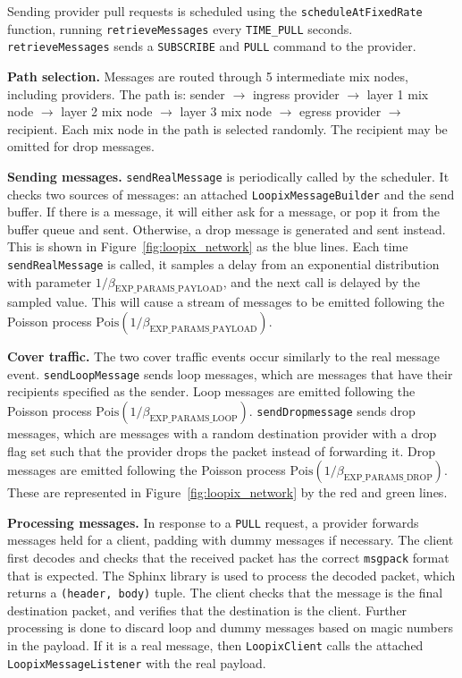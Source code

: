 \documentclass[final,dissertation.tex]{subfiles}
\begin{document}
Sending provider pull requests is scheduled using the \verb|scheduleAtFixedRate| function, running \verb|retrieveMessages| every \verb|TIME_PULL| seconds. \verb|retrieveMessages| sends a \verb|SUBSCRIBE| and \verb|PULL| command to the provider.

\textbf{Path selection.} Messages are routed through 5 intermediate mix nodes, including providers. The path is: sender $\rightarrow$ ingress provider $\rightarrow$ layer 1 mix node $\rightarrow$ layer 2 mix node $\rightarrow$ layer 3 mix node $\rightarrow$ egress provider $\rightarrow$ recipient. Each mix node in the path is selected randomly. The recipient may be omitted for drop messages.

\textbf{Sending messages.} \verb|sendRealMessage| is periodically called by the scheduler. It checks two sources of messages: an attached \verb|LoopixMessageBuilder| and the send buffer. If there is a message, it will either ask for a message, or pop it from the buffer queue and sent. Otherwise, a drop message is generated and sent instead. This is shown in Figure~\ref{fig:loopix_network} as the blue lines. Each time \verb|sendRealMessage| is called, it samples a delay from an exponential distribution with parameter $1/\beta_\text{EXP\_PARAMS\_PAYLOAD}$, and the next call is delayed by the sampled value. This will cause a stream of messages to be emitted following the Poisson process $\text{Pois}(1/\beta_\text{EXP\_PARAMS\_PAYLOAD})$.

\textbf{Cover traffic.} The two cover traffic events occur similarly to the real message event. \verb|sendLoopMessage| sends loop messages, which are messages that have their recipients specified as the sender. Loop messages are emitted following the Poisson process $\text{Pois}(1/\beta_\text{EXP\_PARAMS\_LOOP})$. \verb|sendDropmessage| sends drop messages, which are messages with a random destination provider with a drop flag set such that the provider drops the packet instead of forwarding it. Drop messages are emitted following the Poisson process $\text{Pois}(1/\beta_\text{EXP\_PARAMS\_DROP})$. These are represented in Figure~\ref{fig:loopix_network} by the red and green lines.

\textbf{Processing messages.} In response to a \verb|PULL| request, a provider forwards messages held for a client, padding with dummy messages if necessary. The client first decodes and checks that the received packet has the correct \verb|msgpack| format that is expected. The Sphinx library is used to process the decoded packet, which returns a \verb|(header, body)| tuple. The client checks that the message is the final destination packet, and verifies that the destination is the client. Further processing is done to discard loop and dummy messages based on magic numbers in the payload. If it is a real message, then \verb|LoopixClient| calls the attached \verb|LoopixMessageListener| with the real payload.
\end{document}
